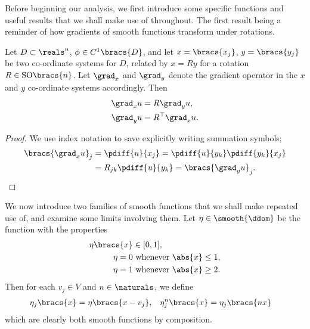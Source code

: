 Before beginning our analysis, we first introduce some specific functions and useful results that we shall make use of throughout.
The first result being a reminder of how gradients of smooth functions transform under rotations.
\begin{lemma} \label{lem:SmoothGradientsUnderRotation}
	Let $D\subset\reals^n$, $\phi\in C^1\bracs{D}$, and let $x=\bracs{x_j}$, $y=\bracs{y_j}$ be two co-ordinate systems for $D$, related by $x=Ry$ for a rotation $R\in\mathrm{SO}\bracs{n}$.
	Let $\grad_x$ and $\grad_y$ denote the gradient operator in the $x$ and $y$ co-ordinate systems accordingly.
	Then
	\begin{align*}
		\grad_x u &= R \grad_y u, \\
		\grad_y u &= R^{\top} \grad_x u.
	\end{align*}
\end{lemma}
\begin{proof}
	We use index notation to save explicitly writing summation symbols;
	\begin{align*}
		\bracs{\grad_x u}_j &= \pdiff{u}{x_j} = \pdiff{u}{y_k}\pdiff{y_k}{x_j} \\
		&= R_{jk}\pdiff{u}{y_k} = \bracs{\grad_y u}_j.
	\end{align*}
\end{proof}

We now introduce two families of smooth functions that we shall make repeated use of, and examine some limits involving them.
Let $\eta\in\smooth{\ddom}$ be the function with the properties
\begin{align*}
	\eta\bracs{x} &\in [0,1], \\
	\eta = 0 &\text{ whenever } \abs{x}\leq 1, \\
	\eta = 1 &\text{ whenever } \abs{x}\geq 2.
\end{align*}
Then for each $v_j\in V$ and $n\in\naturals$, we define
\begin{align} \label{eq:etaDef}
	\eta_j\bracs{x} = \eta\bracs{x-v_j}, &\quad \eta_j^n\bracs{x} = \eta_j\bracs{nx}
\end{align}
which are clearly both smooth functions by composition.

